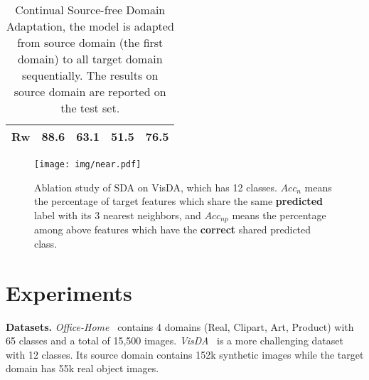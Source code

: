 \documentclass[10pt,twocolumn,letterpaper]{article}
\begin{document}
\begin{table*}[!tbp]
\begin{minipage}[tbp]{0.24\textwidth}
{{\begin{tabular}{|c|c|c|c|c|}
\hline
Rw                & 88.6 & 63.1 & 51.5 & 76.5  \\
\hline
\end{tabular}}}
   \end{minipage}
   \begin{minipage}[tbp]{0.24\textwidth}
\makeatletter 
   \end{minipage}
   \vspace{-2mm}
   \caption{Continual Source-free Domain Adaptation, the model is adapted from source domain (the first domain) to all target domain sequentially. The results on source domain are reported on the test set.\vspace{-4mm}}\label{tab:multi}\vspace{-2mm}
\end{table*}



\begin{figure}[!tbp]
	\centering
	\texttt{[image: img/near.pdf]}
	\vspace{-8mm}
	\caption{Ablation study of SDA on VisDA, which has 12 classes. $Acc_n$ means the percentage of target features which share the same \textbf{predicted} label with its 3 nearest neighbors, and $Acc_{np}$ means the percentage among above features which have the \textbf{correct} shared {predicted} class.\vspace{-2mm}}
	\label{fig:neighbor}
	\vspace{-2mm}
\end{figure}


\section{Experiments}
\noindent \textbf{Datasets.} \emph{Office-Home}~\cite{venkateswara2017deep} contains 4 domains (Real, Clipart, Art, Product) with 65 classes and a total of 15,500 images. \emph{VisDA}~\cite{peng2017visda} is a more challenging dataset with 12 classes. Its source domain contains 152k synthetic images while the target domain has 55k real object images. 
\end{document}
